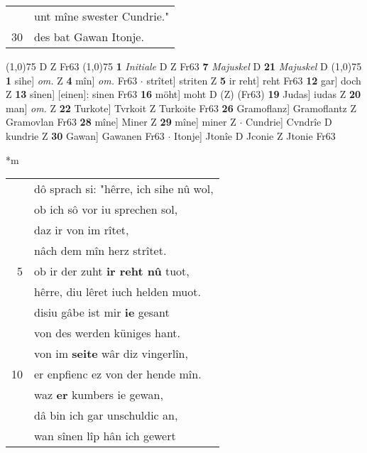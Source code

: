 \documentclass[8pt,a4paper,notitlepage]{article}
\begin{document}
\begin{table}[ht]
\begin{minipage}[t]{0.5\linewidth}
\begin{tabular}{rl}
 & unt mîne swester Cundrie."\\ 
30 & des bat Gawan Itonje.\\ 
\end{tabular}
\scriptsize
\line(1,0){75} \newline
D Z Fr63 \newline
\line(1,0){75} \newline
\textbf{1} \textit{Initiale} D Z Fr63  \textbf{7} \textit{Majuskel} D  \textbf{21} \textit{Majuskel} D  \newline
\line(1,0){75} \newline
\textbf{1} sihe] \textit{om.} Z \textbf{4} mîn] \textit{om.} Fr63  $\cdot$ strîtet] striten Z \textbf{5} ir reht] reht Fr63 \textbf{12} gar] doch Z \textbf{13} sînen] [einen]: sinen Fr63 \textbf{16} möht] moht D (Z) (Fr63) \textbf{19} Judas] iudas Z \textbf{20} man] \textit{om.} Z \textbf{22} Turkote] Tvrkoit Z Turkoite Fr63 \textbf{26} Gramoflanz] Gramoflantz Z Gramovlan Fr63 \textbf{28} mîne] Miner Z \textbf{29} mîne] miner Z  $\cdot$ Cundrie] Cvndrîe D kundrie Z \textbf{30} Gawan] Gawanen Fr63  $\cdot$ Itonje] Jtonîe D Jconie Z Jtonie Fr63 \newline
\end{minipage}
\hspace{0.5cm}
\begin{minipage}[t]{0.5\linewidth}
\small
\begin{center}*m
\end{center}
\begin{tabular}{rl}
 & dô sprach si: "hêrre, ich sihe nû wol,\\ 
 & ob ich sô vor iu sprechen sol,\\ 
 & daz ir von im rîtet,\\ 
 & nâch dem mîn herz strîtet.\\ 
5 & ob ir der zuht \textbf{ir reht nû} tuot,\\ 
 & hêrre, diu lêret iuch helden muot.\\ 
 & disiu gâbe ist mir \textbf{ie} gesant\\ 
 & von des werden küniges hant.\\ 
 & von im \textbf{seite} wâr diz vingerlîn,\\ 
10 & er enpfienc ez von der hende mîn.\\ 
 & waz \textbf{er} kumbers ie gewan,\\ 
 & dâ bin ich gar unschuldic an,\\ 
 & wan sînen lîp hân ich gewert\\ 

\end{tabular}
\end{minipage}
\end{table}
\end{document}
